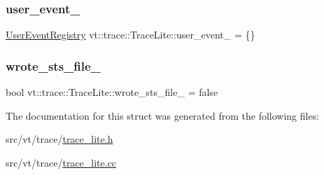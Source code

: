 \subsubsection{\texorpdfstring{user\+\_\+event\+\_\+}{user\_event\_}}
{\footnotesize\ttfamily \hyperlink{structvt_1_1trace_1_1_user_event_registry}{User\+Event\+Registry} vt\+::trace\+::\+Trace\+Lite\+::user\+\_\+event\+\_\+ = \{\}\hspace{0.3cm}{\ttfamily [protected]}}

\mbox{\label{structvt_1_1trace_1_1_trace_lite_a3af89ea00d5dfcf4341aabf9c2b33aef}} 
\subsubsection{\texorpdfstring{wrote\+\_\+sts\+\_\+file\+\_\+}{wrote\_sts\_file\_}}
{\footnotesize\ttfamily bool vt\+::trace\+::\+Trace\+Lite\+::wrote\+\_\+sts\+\_\+file\+\_\+ = false\hspace{0.3cm}{\ttfamily [protected]}}



The documentation for this struct was generated from the following files\+:\begin{DoxyCompactItemize}
\item 
src/vt/trace/\hyperlink{trace__lite_8h}{trace\+\_\+lite.\+h}\item 
src/vt/trace/\hyperlink{trace__lite_8cc}{trace\+\_\+lite.\+cc}\end{DoxyCompactItemize}

